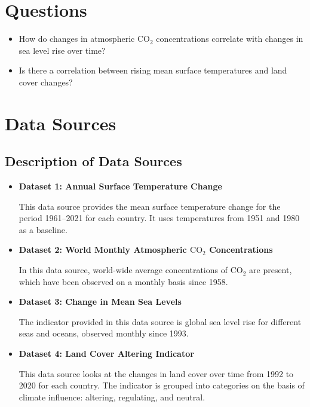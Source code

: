 \documentclass[a4paper,11pt]{article}
\begin{document}
\section{Questions}
\begin{itemize}
    \item How do changes in atmospheric \(\text{CO}_2\) concentrations correlate with changes in sea level rise over time?
    \item Is there a correlation between rising mean surface temperatures and land cover changes?
\end{itemize}

\section{Data Sources}
\subsection{Description of Data Sources}
\begin{itemize}

\item \textbf{Dataset 1: Annual Surface Temperature Change}
    
This data source provides the mean surface temperature change for the period 1961–2021 for each country. It uses temperatures from 1951 and 1980 as a baseline. \cite{dataset1} 
    
\item \textbf{Dataset 2: World Monthly Atmospheric \(\text{CO}_2\) Concentrations}

In this data source, world-wide average concentrations of \(\text{CO}_2\) are present, which have been observed on a monthly basis since 1958. \cite{dataset2}
    
\item \textbf{Dataset 3: Change in Mean Sea Levels}

The indicator provided in this data source is global sea level rise for different seas and oceans, observed monthly since 1993. \cite{dataset3}

\item \textbf{Dataset 4: Land Cover Altering Indicator}

This data source looks at the changes in land cover over time from 1992 to 2020 for each country. The indicator is grouped into categories on the basis of climate influence: altering, regulating, and neutral. \cite{dataset4}

\end{itemize}
\end{document}
